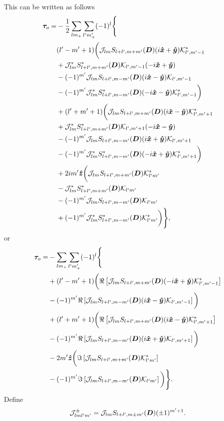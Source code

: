 \documentclass[aps,twocolumn,secnumarabic,balancelastpage,amsmath,amssymb,nofootinbib,floatfix]{revtex4-1}
\begin{document}
This can be written as follows
\begin{equation*}
\begin{aligned}
\bm \tau_o = &-\frac{1}{2}\sum_{lm_+}\sum_{l'm'_+}(-1)^l\Bigg\{\\
&(l'-m'+1)\bigg(\mathcal{J}_{lm}S_{l+l',m+m'}(\bm D)(i\bm{\hat x} + \bm{\hat y})\mathcal{K}^*_{l',m'-1}\\
&+\mathcal{J}_{lm}^*S^*_{l+l',m+m'}(\bm D)\mathcal{K}_{l',m'-1}(-i\bm{\hat x}+\bm{\hat y})\\
&-(-1)^{m'}\mathcal{J}_{lm}S_{l+l',m-m'}(\bm D)(i\bm{\hat x}-\bm{\hat y})\mathcal{K}_{l',m'-1}\\
&-(-1)^{m'}\mathcal{J}_{lm}^*S^*_{l+l',m-m'}(\bm D)(-i\bm{\hat x} - \bm{\hat y})\mathcal{K}^*_{l',m'-1}\bigg)\\
&+(l'+m'+1)\bigg(\mathcal{J}_{lm}S_{l+l',m+m'}(\bm D)(i\bm{\hat x}-\bm{\hat y})\mathcal{K}^*_{l',m'+1}\\
&+\mathcal{J}_{lm}^*S^*_{l+l',m+m'}(\bm D)\mathcal{K}_{l',m'+1}(-i\bm{\hat x} - \bm{\hat y})\\
&-(-1)^{m'}\mathcal{J}_{lm}S_{l+l',m-m'}(\bm D)(i\bm{\hat x} + \bm{\hat y})\mathcal{K}_{l',m'+1}\\
&-(-1)^{m'}\mathcal{J}_{lm}^*S^*_{l+l',m-m'}(\bm D)(-i\bm{\hat x}+\bm{\hat y})\mathcal{K}^*_{l',m'+1}\bigg)\\
&+2im'\bm{\hat z}\bigg(\mathcal{J}_{lm}S_{l+l',m+m'}(\bm D)\mathcal{K}^*_{l'm'}\\
&-\mathcal{J}_{lm}^*S^*_{l+l',m+m'}(\bm D)\mathcal{K}_{l'm'}\\
&-(-1)^{m'}\mathcal{J}_{lm}S_{l+l',m-m'}(\bm D)\mathcal{K}_{l'm'}\\
&+(-1)^{m'}\mathcal{J}_{lm}^*S^*_{l+l',m-m'}(\bm D)\mathcal{K}^*_{l'm'}\bigg)\Bigg\},
\end{aligned}
\end{equation*}
or
\begin{equation*}
\begin{aligned}
\bm \tau_o = &-\sum_{lm_+}\sum_{l'm'_+}(-1)^l\Bigg\{\\
&+(l'-m'+1)\bigg(\Re\left[ \mathcal{J}_{lm}S_{l+l',m+m'}(\bm D)(-i\bm{\hat x}+\bm{\hat y})\mathcal{K}^*_{l',m'-1} \right]\\
&-(-1)^{m'}\Re\left[ \mathcal{J}_{lm}S_{l+l',m-m'}(\bm D)(i\bm{\hat x}-\bm{\hat y})\mathcal{K}_{l',m'-1} \right]\bigg)\\
&+(l'+m'+1)\bigg(\Re\left[ \mathcal{J}_{lm}S_{l+l',m+m'}(\bm D)(i\bm{\hat x}-\bm{\hat y})\mathcal{K}^*_{l',m'+1} \right]\\
&-(-1)^{m'}\Re\left[ \mathcal{J}_{lm}S_{l+l',m-m'}(\bm D)(i\bm{\hat x} + \bm{\hat y})\mathcal{K}_{l',m'+1} \right]\bigg)\\
&-2m'\bm{\hat z}\bigg(\Im\left[ \mathcal{J}_{lm}S_{l+l',m+m'}(\bm D)\mathcal{K}^*_{l'm'} \right]\\
&-(-1)^{m'}\Im\left[ \mathcal{J}_{lm}S_{l+l',m-m'}(\bm D)\mathcal{K}_{l'm'} \right]\bigg)\Bigg\}.
\end{aligned}
\end{equation*}
Define
$$\mathcal{J}_{lml'm'}^\pm = \mathcal{J}_{lm} S_{l+l',m\pm m'}(\bm D)(\pm 1)^{m'+1}.$$
\end{document}
